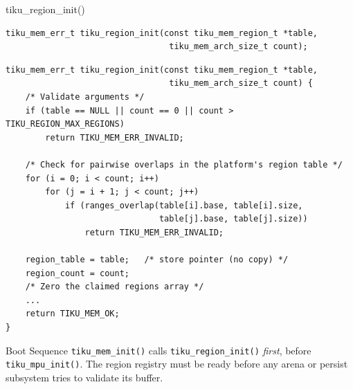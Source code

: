 \documentclass[aspectratio=169, 10pt]{beamer}
\begin{document}
\begin{frame}[fragile]{tiku\_region\_init()}
\begin{lstlisting}[style=cstyle]
tiku_mem_err_t tiku_region_init(const tiku_mem_region_t *table,
                                 tiku_mem_arch_size_t count);
\end{lstlisting}

\begin{lstlisting}[style=cstyle, title={kernel/memory/tiku\_region.c}]
tiku_mem_err_t tiku_region_init(const tiku_mem_region_t *table,
                                 tiku_mem_arch_size_t count) {
    /* Validate arguments */
    if (table == NULL || count == 0 || count > TIKU_REGION_MAX_REGIONS)
        return TIKU_MEM_ERR_INVALID;

    /* Check for pairwise overlaps in the platform's region table */
    for (i = 0; i < count; i++)
        for (j = i + 1; j < count; j++)
            if (ranges_overlap(table[i].base, table[i].size,
                               table[j].base, table[j].size))
                return TIKU_MEM_ERR_INVALID;

    region_table = table;   /* store pointer (no copy) */
    region_count = count;
    /* Zero the claimed regions array */
    ...
    return TIKU_MEM_OK;
}
\end{lstlisting}

\begin{block}{Boot Sequence}
\texttt{tiku\_mem\_init()} calls \texttt{tiku\_region\_init()} \emph{first},
before \texttt{tiku\_mpu\_init()}.  The region registry must be ready before
any arena or persist subsystem tries to validate its buffer.
\end{block}
\end{frame}
\end{document}
